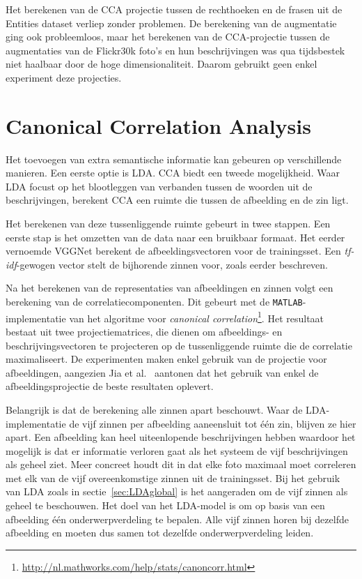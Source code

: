 Het berekenen van de CCA projectie tussen de rechthoeken en de frasen uit de Entities dataset verliep zonder problemen. De berekening van de augmentatie ging ook probleemloos, maar het berekenen van de CCA-projectie tussen de augmentaties van de Flickr30k foto's en hun beschrijvingen was qua tijdsbestek niet haalbaar door de hoge dimensionaliteit. Daarom gebruikt geen enkel experiment deze projecties. 

\section{Canonical Correlation Analysis}
Het toevoegen van extra semantische informatie kan gebeuren op verschillende manieren. Een eerste optie is LDA. CCA biedt een tweede mogelijkheid. Waar LDA focust op het blootleggen van verbanden tussen de woorden uit de beschrijvingen, berekent CCA een ruimte die tussen de afbeelding en de zin ligt.

Het berekenen van deze tussenliggende ruimte gebeurt in twee stappen. Een eerste stap is het omzetten van de data naar een bruikbaar formaat. Het eerder vernoemde VGGNet berekent de afbeeldingsvectoren voor de trainingsset. Een \emph{tf-idf}-gewogen vector stelt de bijhorende zinnen voor, zoals eerder beschreven. 

Na het berekenen van de representaties van afbeeldingen en zinnen volgt een berekening van de correlatiecomponenten. Dit gebeurt met de \texttt{MATLAB}-implementatie van het algoritme voor \emph{canonical correlation}\footnote{\url{http://nl.mathworks.com/help/stats/canoncorr.html}}. Het resultaat bestaat uit twee projectiematrices, die dienen om afbeeldings- en beschrijvingsvectoren te projecteren op de tussenliggende ruimte die de correlatie maximaliseert. De experimenten maken enkel gebruik van de projectie voor afbeeldingen, aangezien Jia et al.~\cite{Fernando2015} aantonen dat het gebruik van enkel de afbeeldingsprojectie de beste resultaten oplevert.

Belangrijk is dat de berekening alle zinnen apart beschouwt. Waar de LDA-implementatie de vijf zinnen per afbeelding aaneensluit tot \'e\'en zin, blijven ze hier apart. Een afbeelding kan heel uiteenlopende beschrijvingen hebben waardoor het mogelijk is dat er informatie verloren gaat als het systeem de vijf beschrijvingen als geheel ziet. Meer concreet houdt dit in dat elke foto maximaal moet correleren met elk van de vijf overeenkomstige zinnen uit de trainingsset. Bij het gebruik van LDA zoals in sectie~\ref{sec:LDAglobal} is het aangeraden om de vijf zinnen als geheel te beschouwen. Het doel van het LDA-model is om op basis van een afbeelding \'e\'en onderwerpverdeling te bepalen. Alle vijf zinnen horen bij dezelfde afbeelding en moeten dus samen tot dezelfde onderwerpverdeling leiden.

